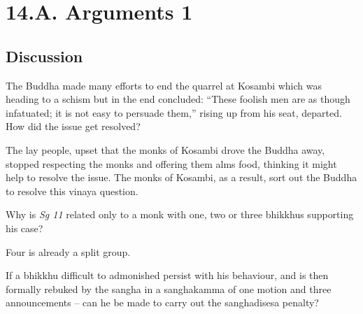 \chapter{14.A. Arguments 1}
\renewcommand*{\theChapterTitle}{14.A. Arguments 1}

\section*{Discussion}


The Buddha made many efforts to end the quarrel at Kosambi which was heading to
a schism but in the end concluded: “These foolish men are as though infatuated;
it is not easy to persuade them,” rising up from his seat, departed. How did the
issue get resolved?

\begin{solution}
  The lay people, upset that the monks of Kosambi drove the Buddha away,
  stopped respecting the monks and offering them alms food, thinking it might
  help to resolve the issue. The monks of Kosambi, as a result, sort out the
  Buddha to resolve this vinaya question.
\end{solution}

\bigskip


Why is \emph{Sg 11} related only to a monk with one, two or three bhikkhus supporting his case?

\bigskip

\begin{solution}
  Four is already a split group.
\end{solution}


If a bhikkhu difficult to admonished persist with his behaviour, and is then
formally rebuked by the sangha in a sanghakamma of one motion and three
announcements – can he be made to carry out the sanghadisesa penalty?

